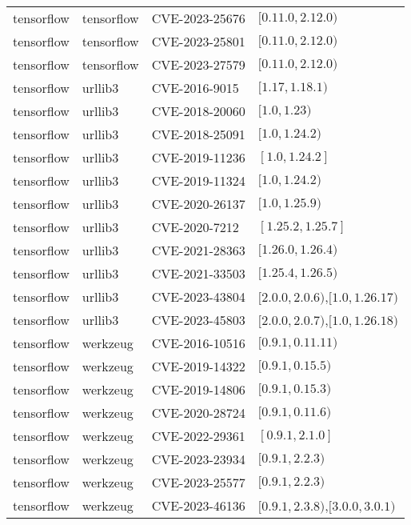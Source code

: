 \begin{tabular}{llll}
tensorflow & tensorflow & CVE-2023-25676 & $[0.11.0,2.12.0)$ \\
tensorflow & tensorflow & CVE-2023-25801 & $[0.11.0,2.12.0)$ \\
tensorflow & tensorflow & CVE-2023-27579 & $[0.11.0,2.12.0)$ \\
tensorflow & urllib3 & CVE-2016-9015 & $[1.17,1.18.1)$ \\
tensorflow & urllib3 & CVE-2018-20060 & $[1.0,1.23)$ \\
tensorflow & urllib3 & CVE-2018-25091 & $[1.0,1.24.2)$ \\
tensorflow & urllib3 & CVE-2019-11236 & $[1.0,1.24.2]$ \\
tensorflow & urllib3 & CVE-2019-11324 & $[1.0,1.24.2)$ \\
tensorflow & urllib3 & CVE-2020-26137 & $[1.0,1.25.9)$ \\
tensorflow & urllib3 & CVE-2020-7212 & $[1.25.2,1.25.7]$ \\
tensorflow & urllib3 & CVE-2021-28363 & $[1.26.0,1.26.4)$ \\
tensorflow & urllib3 & CVE-2021-33503 & $[1.25.4,1.26.5)$ \\
tensorflow & urllib3 & CVE-2023-43804 & $[2.0.0,2.0.6)$,$[1.0,1.26.17)$ \\
tensorflow & urllib3 & CVE-2023-45803 & $[2.0.0,2.0.7)$,$[1.0,1.26.18)$ \\
tensorflow & werkzeug & CVE-2016-10516 & $[0.9.1,0.11.11)$ \\
tensorflow & werkzeug & CVE-2019-14322 & $[0.9.1,0.15.5)$ \\
tensorflow & werkzeug & CVE-2019-14806 & $[0.9.1,0.15.3)$ \\
tensorflow & werkzeug & CVE-2020-28724 & $[0.9.1,0.11.6)$ \\
tensorflow & werkzeug & CVE-2022-29361 & $[0.9.1,2.1.0]$ \\
tensorflow & werkzeug & CVE-2023-23934 & $[0.9.1,2.2.3)$ \\
tensorflow & werkzeug & CVE-2023-25577 & $[0.9.1,2.2.3)$ \\
tensorflow & werkzeug & CVE-2023-46136 & $[0.9.1,2.3.8)$,$[3.0.0,3.0.1)$ \\
\bottomrule
\end{tabular}
